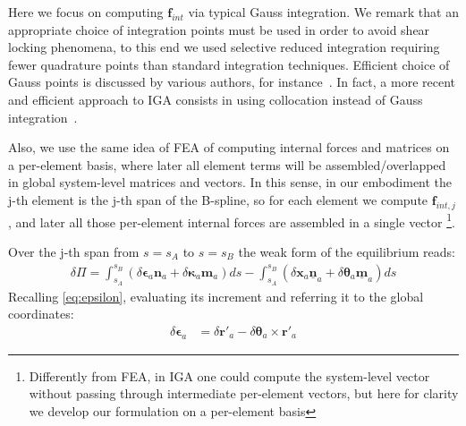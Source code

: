 \documentclass[review]{elsarticle}
\def\avect#1{{\boldsymbol{#1}}}
\begin{document}
Here we focus on computing $\avect{f}_{int}$ via typical Gauss integration. We remark that an appropriate choice of integration points must be used in order to avoid shear locking phenomena, to this end we used selective reduced integration requiring fewer quadrature points than standard integration techniques. Efficient choice of Gauss points is discussed by various authors, for instance~\cite{Hughes2010301,Hillman2015521,Adam2015732}. In fact, a more recent and efficient approach to IGA consists in using collocation instead of Gauss integration~\cite{Auricchio2013IGA,Marino2017546,weeger2018frictional}.

Also, we use the same idea of FEA of computing internal forces and matrices on a per-element basis, where later all element terms will be assembled/overlapped in global system-level matrices and vectors. In this sense, in our embodiment the j-th element is the j-th span of the B-spline, so for each element we compute 
$\avect{f}_{int,j}$, and later all those per-element internal forces are assembled in a single vector
\footnote{Differently from FEA, in IGA one could compute the system-level vector without passing through intermediate per-element vectors, but here for clarity we develop our formulation on a per-element basis}.

%
%
Over the j-th span from $s=s_A$ to $s=s_B$ the weak form of the equilibrium reads:
%
\begin{align}
\delta\Pi = 
 \int_{s_A}^{s_B} \left( \delta\avect{\epsilon}_a \avect{n}_a + \delta\avect{\kappa}_a \avect{m}_a \right) ds 
-\int_{s_A}^{s_B} \left( \delta\avect{x}_a \underline{\avect{n}}_a + \delta\avect{\theta}_a\underline{\avect{m}}_a \right) ds 
\end{align}
%
Recalling \eqref{eq:epsilon}, evaluating its increment and referring it to the global coordinates:
\begin{align}
\delta\avect{\epsilon}_a &= \delta\avect{r}'_a - \delta\avect{\theta}_a \times \avect{r}'_a  
\end{align}
\end{document}
